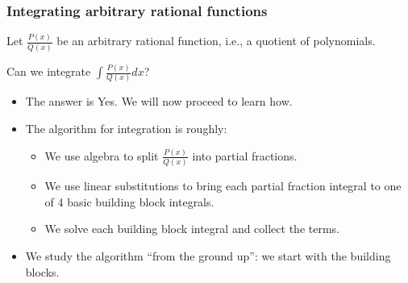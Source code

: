 \begin{frame}
\frametitle{Integrating arbitrary rational functions}
Let $\frac{P(x)}{Q(x)}$ be an arbitrary rational function, i.e., a quotient of polynomials.
\begin{question}
Can we integrate $\displaystyle\int \frac{P(x)}{Q(x)}dx$?
\end{question}
\begin{itemize}
\item The answer is Yes. We will now proceed to learn how.
\item The algorithm for integration is roughly:
\begin{itemize}
\item We use algebra to split $\frac{P(x)}{Q(x)}$ into partial fractions. 
\item We use linear substitutions to bring each partial fraction integral to one of 4 basic building block integrals.
\item We solve each building block integral and collect the terms.
\end{itemize}
\item We study the algorithm ``from the ground up'': we start with the building blocks.
\end{itemize}
\end{frame}

